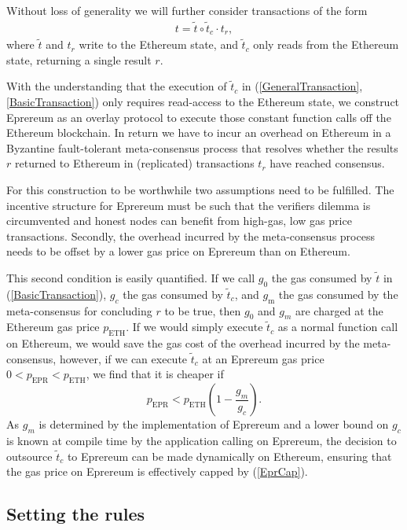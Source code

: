\documentclass[twocolumn]{article}
\begin{document}
Without loss of generality we will further consider transactions of the form
\begin{align} \label{BasicTransaction}
	t = \tilde{t} \circ \tilde{t}_c \cdot t_r,
\end{align}
where $\tilde{t}$ and $t_r$ write to the Ethereum state, and $\tilde{t}_c$ only reads from the Ethereum state, returning a single result $r$.

With the understanding that the execution of $\tilde{t}_c$ in (\ref{GeneralTransaction}, \ref{BasicTransaction}) only requires read-access to the Ethereum state, we construct Eprereum as an overlay protocol to execute those constant function calls off the Ethereum blockchain.  In return we have to incur an overhead on Ethereum in a Byzantine fault-tolerant meta-consensus process that resolves whether the results $r$ returned to Ethereum in (replicated) transactions $t_r$ have reached consensus.

For this construction to be worthwhile two assumptions need to be fulfilled. The incentive structure for Eprereum must be such that the verifiers dilemma is circumvented and honest nodes can benefit from high-gas, low gas price transactions.  Secondly, the overhead incurred by the meta-consensus process needs to be offset by a lower gas price on Eprereum than on Ethereum.

This second condition is easily quantified.  If we call $g_0$ the gas consumed by $\tilde{t}$ in (\ref{BasicTransaction}), $g_c$ the gas consumed by $\tilde{t}_c$, and $g_\text{m}$ the gas consumed by the meta-consensus for concluding $r$ to be true, then $g_0$ and $g_m$ are charged at the Ethereum gas price $p_\text{ETH}$.  If we would simply execute $\tilde{t}_c$ as a normal function call on Ethereum, we would save the gas cost of the overhead incurred by the meta-consensus, however, if we can execute $\tilde{t}_c$ at an Eprereum gas price $0 < p_\text{EPR} < p_\text{ETH}$, we find that it is cheaper if 
\begin{equation} \label{EprCap}
	p_\text{EPR} < p_\text{ETH}\left( 1 - \frac{g_m}{g_c} \right).
\end{equation}
As $g_m$ is determined by the implementation of Eprereum and a lower bound on $g_c$ is known at compile time by the application calling on Eprereum, the decision to outsource $\tilde{t}_c$ to Eprereum can be made dynamically on Ethereum, ensuring that the gas price on Eprereum is effectively capped by (\ref{EprCap}).

\subsection{Setting the rules}
\end{document}

